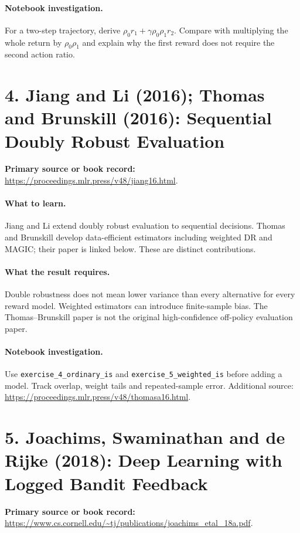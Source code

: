 \documentclass[11pt]{scrartcl}
\begin{document}
\paragraph{Notebook investigation.} For a two-step trajectory, derive $\rho_0r_1+\gamma\rho_0\rho_1r_2$. Compare with multiplying the whole return by $\rho_0\rho_1$ and explain why the first reward does not require the second action ratio.

\section*{4. Jiang and Li (2016); Thomas and Brunskill (2016): Sequential Doubly Robust Evaluation}
\textbf{Primary source or book record:} \url{https://proceedings.mlr.press/v48/jiang16.html}.

\paragraph{What to learn.} Jiang and Li extend doubly robust evaluation to sequential decisions. Thomas and Brunskill develop data-efficient estimators including weighted DR and MAGIC; their paper is linked below. These are distinct contributions.

\paragraph{What the result requires.} Double robustness does not mean lower variance than every alternative for every reward model. Weighted estimators can introduce finite-sample bias. The Thomas--Brunskill paper is not the original high-confidence off-policy evaluation paper.

\paragraph{Notebook investigation.} Use \texttt{exercise\_4\_ordinary\_is} and \texttt{exercise\_5\_weighted\_is} before adding a model. Track overlap, weight tails and repeated-sample error. Additional source: \url{https://proceedings.mlr.press/v48/thomasa16.html}.

\section*{5. Joachims, Swaminathan and de Rijke (2018): Deep Learning with Logged Bandit Feedback}
\textbf{Primary source or book record:} \url{https://www.cs.cornell.edu/~tj/publications/joachims_etal_18a.pdf}.
\end{document}

